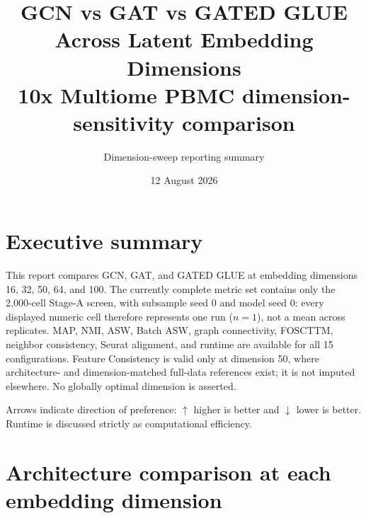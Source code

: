 \documentclass[10pt]{article}
\title{\textbf{GCN vs GAT vs GATED GLUE Across Latent Embedding Dimensions}\\[5pt]
\large 10x Multiome PBMC dimension-sensitivity comparison}
\author{Dimension-sweep reporting summary}
\date{12 August 2026}
\begin{document}
\maketitle
\tableofcontents
\newpage
\section{Executive summary}
This report compares GCN, GAT, and GATED GLUE at embedding dimensions 16, 32, 50, 64, and 100. The currently complete metric set contains only the 2,000-cell Stage-A screen, with subsample seed 0 and model seed 0: every displayed numeric cell therefore represents one run ($n=1$), not a mean across replicates. MAP, NMI, ASW, Batch ASW, graph connectivity, FOSCTTM, neighbor consistency, Seurat alignment, and runtime are available for all 15 configurations. Feature Consistency is valid only at dimension 50, where architecture- and dimension-matched full-data references exist; it is not imputed elsewhere. No globally optimal dimension is asserted.

Arrows indicate direction of preference: $\uparrow$ higher is better and $\downarrow$ lower is better. Runtime is discussed strictly as computational efficiency.

\section{Architecture comparison at each embedding dimension}
\end{document}
